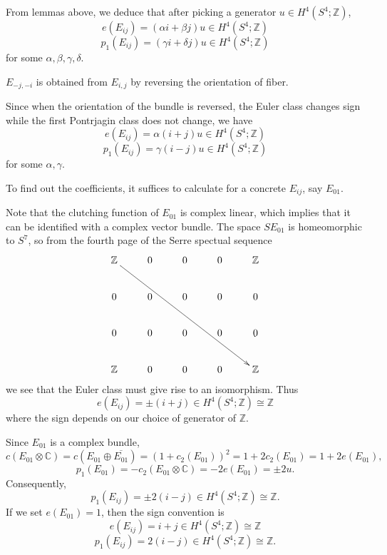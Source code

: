 \documentclass[twoside]{article}
\begin{document}
From lemmas above, we deduce that after picking a generator $u\in H^4(S^4;\mathbb{Z})$, 
\[
e(E_{ij}) = (\alpha i + \beta j)u  \in   H^4(S^4;\mathbb{Z})
\]
\[
p_1(E_{ij}) = (\gamma i + \delta j)u  \in   H^4(S^4;\mathbb{Z})
\]
for some $\alpha, \beta, \gamma, \delta$. 

\begin{lem}
	$E_{-j,-i}$ is obtained from $E_{i,j}$ by reversing the orientation of fiber. 
\end{lem}

Since when the orientation of the bundle is reversed, the Euler class changes sign while the first Pontrjagin class does not change, we have
\[
e(E_{ij}) = \alpha (i +  j)u  \in   H^4(S^4;\mathbb{Z})
\]
\[
p_1(E_{ij}) = \gamma (i- j)u  \in   H^4(S^4;\mathbb{Z})
\]
for some $\alpha, \gamma$. 

To find out the coefficients, it suffices to calculate for a concrete $E_{ij}$, say $E_{01}$. 

Note that the clutching function of $E_{01}$ is complex linear, which implies that it can be identified with a complex vector bundle. The space $SE_{01}$ is homeomorphic to $S^7$, so from the fourth page of the Serre spectual sequence
\[
\xymatrix{
	\mathbb{Z}\ar[rrrrddd]&0&0&0&\mathbb{Z}\\
	0&0&0&0&0\\
	0&0&0&0&0\\
	\mathbb{Z}&0&0&0&\mathbb{Z}
}
\]
we see that the Euler class must give rise to an isomorphism. Thus 
\[
e(E_{ij}) = \pm(i +  j) \in   H^4(S^4;\mathbb{Z}) \cong \mathbb{Z}
\]
where the sign depends on our choice of generator of $\mathbb{Z}$. 

Since $E_{01}$ is a complex bundle, 
\[
c(E_{01} \otimes \mathbb{C}) = c(E_{01} \oplus  \overline{E_{01}}) = (1 + c_2(E_{01}))^2 = 1 + 2c_2(E_{01}) = 1 + 2e(E_{01}), 
\]
\[
p_1(E_{01}) = -c_2(E_{01} \otimes \mathbb{C}) = -2e(E_{01}) = \pm 2 u. 
\]
Consequently, 
\[
p_1(E_{ij}) = \pm 2(i- j)  \in   H^4(S^4;\mathbb{Z}) \cong \mathbb{Z}. 
\]
If we set $e(E_{01}) = 1$, then the sign convention is 
\[
e(E_{ij}) = i +  j\in H^4(S^4;\mathbb{Z}) \cong \mathbb{Z}
\]
\[
p_1(E_{ij}) = 2(i- j)  \in   H^4(S^4;\mathbb{Z}) \cong \mathbb{Z}. 
\]
\end{document}
